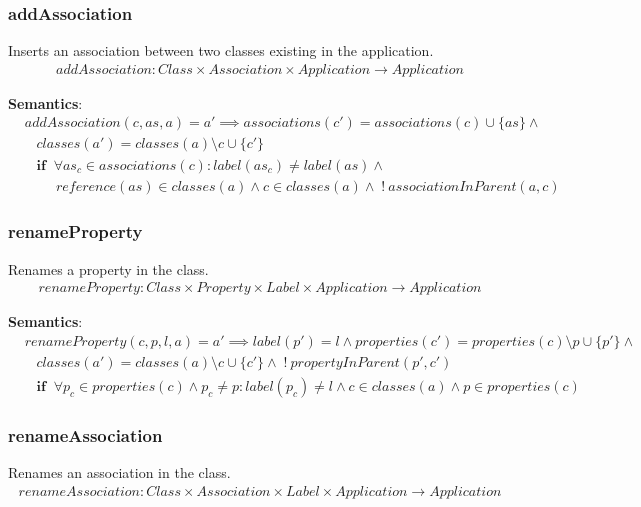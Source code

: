 \documentclass[10pt]{article}
\begin{document}
\subsubsection{addAssociation}
Inserts an association between two classes existing in the application.
\begin{align}
addAssociation: Class \times Association  \times Application \rightarrow Application
\end{align}

\noindent \textbf{Semantics}:
\begin{align}
& addAssociation(c, as, a) = a' \implies associations(c') = associations(c) \cup \{ as \}  \land \nonumber \\
& \;\;\; classes(a') = classes(a) \setminus c  \cup \{c'\}  \nonumber \\
& \;\;\; \mathbf{if} \;\; \forall as_c \in associations(c) : label(as_c) \neq label(as) \land \nonumber \\
& \;\;\;\;\;\;\;\; reference(as) \in classes(a) \land c \in classes(a) \land \; !\: associationInParent(a, c)
\end{align}

\subsubsection{renameProperty}
Renames a property in the class.
\begin{align}
renameProperty: Class \times Property \times Label \times Application \rightarrow Application
\end{align}

\noindent \textbf{Semantics}:
\begin{align}
& renameProperty(c, p, l, a) = a' \implies  label(p') = l  \land properties(c') = properties(c) \setminus p \cup \{ p' \} \land \nonumber \\
& \;\;\; classes(a') = classes(a) \setminus c  \cup \{c'\} \land \; ! \: propertyInParent(p', c') \nonumber \\
& \;\;\; \mathbf{if} \;\; \forall p_c \in properties(c) \land p_c \neq p : label(p_c) \neq l \land c \in classes(a) \land p \in properties(c)
\end{align}

\subsubsection{renameAssociation}
Renames an association in the class.
\begin{align}
renameAssociation: Class \times Association \times Label \times Application \rightarrow Application
\end{align}
\end{document}
